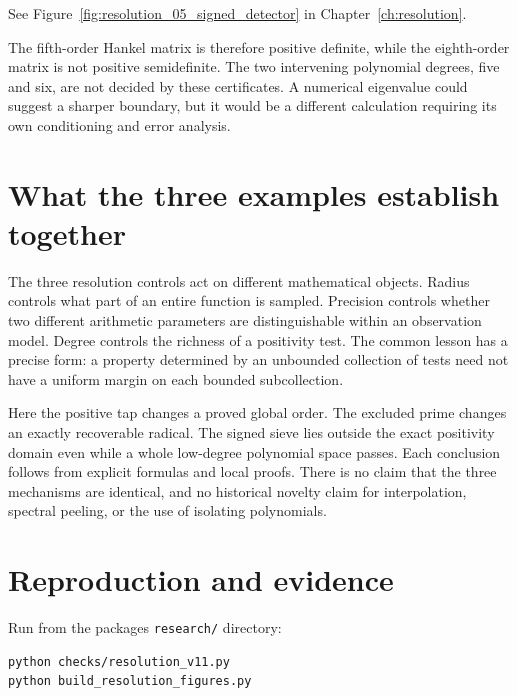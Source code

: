 See Figure~\ref{fig:resolution_05_signed_detector} in Chapter~\ref{ch:resolution}.

The fifth-order Hankel matrix is therefore positive definite, while the
eighth-order matrix is not positive semidefinite. The two intervening
polynomial degrees, five and six, are not decided by these certificates.
A numerical eigenvalue could suggest a sharper boundary, but it would be
a different calculation requiring its own conditioning and error
analysis.

\hypertarget{v11-resolution_full-what-the-three-examples-establish-together}{%
\section{What the three examples establish
together}\label{v11-resolution_full-what-the-three-examples-establish-together}}

The three resolution controls act on different mathematical objects.
Radius controls what part of an entire function is sampled. Precision
controls whether two different arithmetic parameters are distinguishable
within an observation model. Degree controls the richness of a
positivity test. The common lesson has a precise form: a property
determined by an unbounded collection of tests need not have a uniform
margin on each bounded subcollection.

Here the positive tap changes a proved global order. The excluded prime
changes an exactly recoverable radical. The signed sieve lies outside
the exact positivity domain even while a whole low-degree polynomial
space passes. Each conclusion follows from explicit formulas and local
proofs. There is no claim that the three mechanisms are identical, and
no historical novelty claim for interpolation, spectral peeling, or the
use of isolating polynomials.

\hypertarget{v11-resolution_full-reproduction-and-evidence}{%
\section{Reproduction and
evidence}\label{v11-resolution_full-reproduction-and-evidence}}

Run from the package\textquotesingle s \texttt{research/} directory:

\begin{verbatim}
python checks/resolution_v11.py
python build_resolution_figures.py
\end{verbatim}

